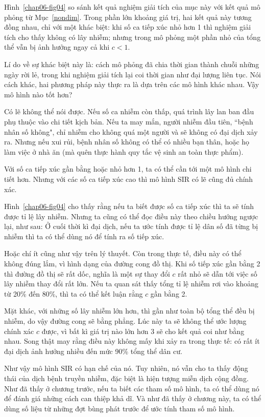 \documentclass[12pt]{book}
\theoremstyle{exercise}
\begin{document}
Hình~\ref{chap06-fig04} so sánh kết quả nghiệm giải tích của mục này với kết quả mô phỏng từ Mục~\ref{nondim}. Trong phần lớn khoảng giá trị, hai kết quả này tương đồng nhau, chỉ với một khác biệt: khi số ca tiếp xúc nhỏ hơn 1 thì nghiệm giải tích cho thấy không có lây nhiễm; nhưng trong mô phỏng một phần nhỏ của tổng thể vẫn bị ảnh hưởng ngay cả khi $c<1$.

Lí do về sự khác biệt này là: cách mô phỏng đã chia thời gian thành chuỗi những ngày rời lẻ, trong khi nghiệm giải tích lại coi thời gian như đại lượng liên tục. Nói cách khác, hai phương pháp này thực ra là dựa trên các mô hình khác nhau. Vậy mô hình nào tốt hơn?

Có lẽ không thể nói được. Nếu số ca nhiễm còn thấp, quá trình lây lan ban đầu phụ thuộc vào chi tiết kịch bản. Nếu ta may mắn, người nhiễm đầu tiên, ``bệnh nhân số không", chỉ nhiễm cho không quá một người và sẽ không có đại dịch xảy ra. Nhưng nếu xui rủi, bệnh nhân số không có thể có nhiều bạn thân, hoặc họ làm việc ở nhà ăn (mà quên thực hành quy tắc vệ sinh an toàn thực phẩm).

Với số ca tiếp xúc gần bằng hoặc nhỏ hơn 1, ta có thể cần tới một mô hình chi tiết hơn. Nhưng với các số ca tiếp xúc cao thì mô hình SIR có lẽ cũng đủ chính xác.

Hình~\ref{chap06-fig04} cho thấy rằng nếu ta biết được số ca tiếp xúc thì ta sẽ tính được tỉ lệ lây nhiễm. Nhưng ta cũng có thể đọc điều này theo chiều hướng ngược lại, như sau: Ở cuối thời kì đại dịch, nếu ta ước tính được tỉ lệ dân số đã từng bị nhiễm thì ta có thể dùng nó để tính ra số tiếp xúc.

Hoặc chí ít cũng như vậy trên lý thuyết. Còn trong thực tế, điều này có thể không đúng lắm, vì hình dạng của đường cong đồ thị. Khi số tiếp xúc gần bằng 2 thì đường đồ thị sẽ rất dốc, nghĩa là một sự thay đổi $c$ rất nhỏ sẽ dẫn tới việc số lây nhiễm thay đổi rất lớn. Nếu ta quan sát thấy tổng tỉ lệ nhiễm rơi vào khoảng từ 20\% đến 80\%, thì ta có thể kết luận rằng $c$ gần bằng 2.

Mặt khác, với những số lây nhiễm lớn hơn, thì gần như toàn bộ tổng thể đều bị nhiễm, do vậy đường cong sẽ bằng phẳng. Lúc này ta sẽ không thể ước lượng chính xác $c$ được, vì bất kì giá trị nào lớn hơn 3 sẽ cho kết quả coi như bằng nhau. Song thật may rằng điều này không mấy khi xảy ra trong thực tế: có rất ít đại dịch ảnh hưởng nhiều đến mức 90\% tổng thể dân cư.

Như vậy mô hình SIR có hạn chế của nó. Tuy nhiên, nó vẫn cho ta thấy động thái của dịch bệnh truyền nhiễm, đặc biệt là hiện tượng miễn dịch cộng đồng. Như đã thấy ở chương trước, nếu ta biết các tham số mô hình, ta có thể dùng nó để đánh giá những cách can thiệp khả dĩ. Và như đã thấy ở chương này, ta có thể dùng số liệu từ những đợt bùng phát trước để ước tính tham số mô hình.
\end{document}
